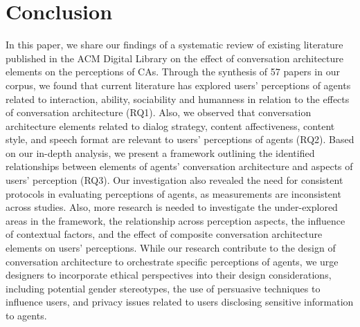 
\section{Conclusion}

In this paper, we share our findings of a systematic review of existing literature published in the ACM Digital Library on the effect of conversation architecture elements on the perceptions of CAs. Through the synthesis of 57 papers in our corpus, we found that current literature has explored users' perceptions of agents related to interaction, ability, sociability and humanness in relation to the effects of conversation architecture (RQ1). Also, we observed that conversation architecture elements related to dialog strategy, content affectiveness, content style, and speech format are relevant to users' perceptions of agents (RQ2). Based on our in-depth analysis, we present a framework outlining the identified relationships between elements of agents' conversation architecture and aspects of users' perception (RQ3). Our investigation also revealed the need for consistent protocols in evaluating perceptions of agents, as measurements are inconsistent across studies. Also, more research is needed to investigate the under-explored areas in the framework, the relationship across perception aspects, the influence of contextual factors, and the effect of composite conversation architecture elements on users' perceptions. While our research contribute to the design of conversation architecture to orchestrate specific perceptions of agents, we urge designers to incorporate ethical perspectives into their design considerations, including potential gender stereotypes, the use of persuasive techniques to influence users, and privacy issues related to users disclosing sensitive information to agents.